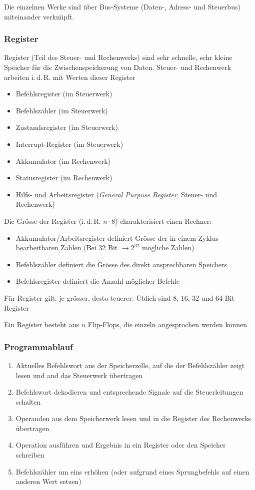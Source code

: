 Die einzelnen Werke sind über Bus-Systeme (Daten-, Adress- und Steuerbus) miteinander verknüpft.

\subsubsection{Register}
Register (Teil des Steuer- und Rechenwerks) sind sehr schnelle, sehr kleine Speicher für die Zwischenspeicherung von Daten. Steuer- und Rechenwerk arbeiten i.\,d.\,R. mit Werten dieser Register

\begin{itemize}\itemsep0em
	\item Befehlsregister (im Steuerwerk)
	\item Befehlszähler (im Steuerwerk)
	\item Zustandsregister (im Steuerwerk)
	\item Interrupt-Register (im Steuerwerk)
	\item Akkumulator (im Rechenwerk)
	\item Statusregister (im Rechenwerk)
	\item Hilfs- und Arbeitsregister (\textit{General Purpuse Register}, Steuer- und Rechenwerk)
\end{itemize}

Die Grösse der Register (i.\,d.\,R. $n \cdot 8$) charakterisiert einen Rechner:
\begin{itemize}\itemsep0em
	\item Akkumulator/Arbeitsregister definiert Grösse der in einem Zyklus bearbeitbaren Zahlen
	(Bei 32 Bit $\rightarrow 2^{32}$ mögliche Zahlen)
	\item Befehlszähler definiert die Grösse des direkt ansprechbaren Speichers
	\item Befehlsregister definiert die Anzahl möglicher Befehle
\end{itemize}
Für Register gilt: je grösser, desto teuerer. Üblich sind 8, 16, 32 und 64 Bit Register

Ein Register besteht aus $n$ Flip-Flops, die einzeln angesprochen werden können

\subsubsection{Programmablauf}
\begin{enumerate}\itemsep0em
	\item Aktuelles Befehlswort aus der Speicherzelle, auf die der Befehlszähler zeigt lesen und and das Steuerwerk übertragen
	\item Befehlswort dekodieren und entsprechende Signale auf die Steuerleitungen schalten
	\item Operanden aus dem Speicherwerk lesen und in die Register des Rechenwerks übertragen
	\item Operation ausführen und Ergebnis in ein Register oder den Speicher schreiben
	\item Befehlszähler um eins erhöhen (oder aufgrund eines Sprungbefehls auf einen anderen Wert setzen)
\end{enumerate}


